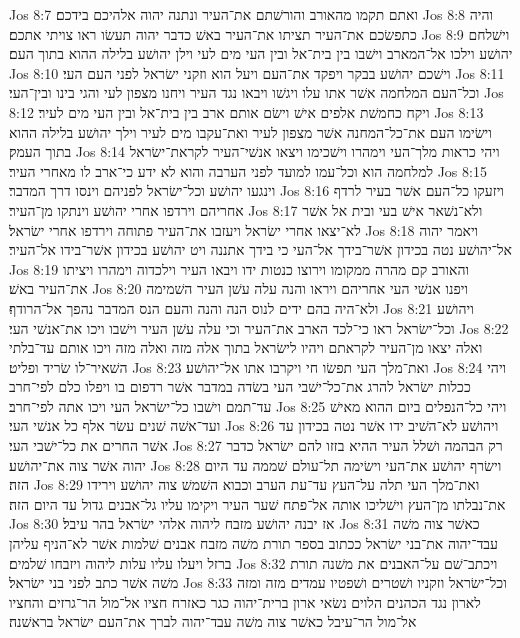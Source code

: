 Jos 8:7  ואתם תקמו מהאורב והורשׁתם את־העיר ונתנה יהוה אלהיכם בידכם׃
Jos 8:8  והיה כתפשׂכם את־העיר תציתו את־העיר באשׁ כדבר יהוה תעשׂו ראו צויתי אתכם׃
Jos 8:9  וישׁלחם יהושׁע וילכו אל־המארב וישׁבו בין בית־אל ובין העי מים לעי וילן יהושׁע בלילה ההוא בתוך העם׃
Jos 8:10  וישׁכם יהושׁע בבקר ויפקד את־העם ויעל הוא וזקני ישׂראל לפני העם העי׃
Jos 8:11  וכל־העם המלחמה אשׁר אתו עלו ויגשׁו ויבאו נגד העיר ויחנו מצפון לעי והגי בינו ובין־העי׃
Jos 8:12  ויקח כחמשׁת אלפים אישׁ וישׂם אותם ארב בין בית־אל ובין העי מים לעיר׃
Jos 8:13  וישׂימו העם את־כל־המחנה אשׁר מצפון לעיר ואת־עקבו מים לעיר וילך יהושׁע בלילה ההוא בתוך העמק׃
Jos 8:14  ויהי כראות מלך־העי וימהרו וישׁכימו ויצאו אנשׁי־העיר לקראת־ישׂראל למלחמה הוא וכל־עמו למועד לפני הערבה והוא לא ידע כי־ארב לו מאחרי העיר׃
Jos 8:15  וינגעו יהושׁע וכל־ישׂראל לפניהם וינסו דרך המדבר׃
Jos 8:16  ויזעקו כל־העם אשׁר בעיר לרדף אחריהם וירדפו אחרי יהושׁע וינתקו מן־העיר׃
Jos 8:17  ולא־נשׁאר אישׁ בעי ובית אל אשׁר לא־יצאו אחרי ישׂראל ויעזבו את־העיר פתוחה וירדפו אחרי ישׂראל׃
Jos 8:18  ויאמר יהוה אל־יהושׁע נטה בכידון אשׁר־בידך אל־העי כי בידך אתננה ויט יהושׁע בכידון אשׁר־בידו אל־העיר׃
Jos 8:19  והאורב קם מהרה ממקומו וירוצו כנטות ידו ויבאו העיר וילכדוה וימהרו ויציתו את־העיר באשׁ׃
Jos 8:20  ויפנו אנשׁי העי אחריהם ויראו והנה עלה עשׁן העיר השׁמימה ולא־היה בהם ידים לנוס הנה והנה והעם הנס המדבר נהפך אל־הרודף׃
Jos 8:21  ויהושׁע וכל־ישׂראל ראו כי־לכד הארב את־העיר וכי עלה עשׁן העיר וישׁבו ויכו את־אנשׁי העי׃
Jos 8:22  ואלה יצאו מן־העיר לקראתם ויהיו לישׂראל בתוך אלה מזה ואלה מזה ויכו אותם עד־בלתי השׁאיר־לו שׂריד ופליט׃
Jos 8:23  ואת־מלך העי תפשׂו חי ויקרבו אתו אל־יהושׁע׃
Jos 8:24  ויהי ככלות ישׂראל להרג את־כל־ישׁבי העי בשׂדה במדבר אשׁר רדפום בו ויפלו כלם לפי־חרב עד־תמם וישׁבו כל־ישׂראל העי ויכו אתה לפי־חרב׃
Jos 8:25  ויהי כל־הנפלים ביום ההוא מאישׁ ועד־אשׁה שׁנים עשׂר אלף כל אנשׁי העי׃
Jos 8:26  ויהושׁע לא־השׁיב ידו אשׁר נטה בכידון עד אשׁר החרים את כל־ישׁבי העי׃
Jos 8:27  רק הבהמה ושׁלל העיר ההיא בזזו להם ישׂראל כדבר יהוה אשׁר צוה את־יהושׁע׃
Jos 8:28  וישׂרף יהושׁע את־העי וישׂימה תל־עולם שׁממה עד היום הזה׃
Jos 8:29  ואת־מלך העי תלה על־העץ עד־עת הערב וכבוא השׁמשׁ צוה יהושׁע וירידו את־נבלתו מן־העץ וישׁליכו אותה אל־פתח שׁער העיר ויקימו עליו גל־אבנים גדול עד היום הזה׃
Jos 8:30  אז יבנה יהושׁע מזבח ליהוה אלהי ישׂראל בהר עיבל׃
Jos 8:31  כאשׁר צוה משׁה עבד־יהוה את־בני ישׂראל ככתוב בספר תורת משׁה מזבח אבנים שׁלמות אשׁר לא־הניף עליהן ברזל ויעלו עליו עלות ליהוה ויזבחו שׁלמים׃
Jos 8:32  ויכתב־שׁם על־האבנים את משׁנה תורת משׁה אשׁר כתב לפני בני ישׂראל׃
Jos 8:33  וכל־ישׂראל וזקניו ושׁטרים ושׁפטיו עמדים מזה ומזה לארון נגד הכהנים הלוים נשׂאי ארון ברית־יהוה כגר כאזרח חציו אל־מול הר־גרזים והחציו אל־מול הר־עיבל כאשׁר צוה משׁה עבד־יהוה לברך את־העם ישׂראל בראשׁנה׃
